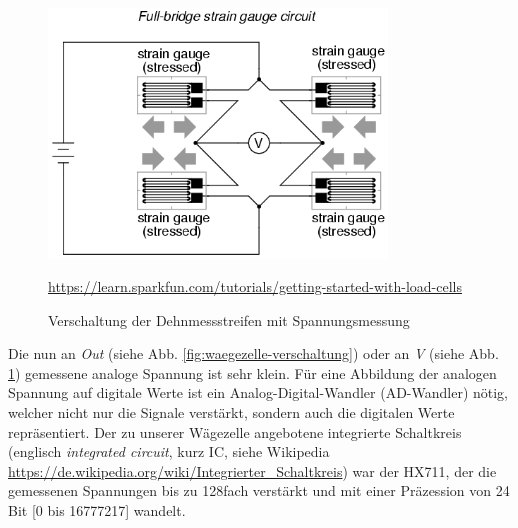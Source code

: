 \begin{figure}[H]
    \center
    \includegraphics[width=9cm]{Bilder/waegezelle-full.png}\\
    \caption{Verschaltung der Dehnmessstreifen mit Spannungsmessung}
    \begin{flushleft} \quelle\url{https://learn.sparkfun.com/tutorials/getting-started-with-load-cells} \end{flushleft}
    \label{fig:waegezelle-full}
\end{figure}
\noindent
Die nun an \textit{Out} (siehe Abb. \ref{fig:waegezelle-verschaltung}) oder an \textit{V} (siehe Abb. \ref{fig:waegezelle-full}) gemessene analoge Spannung ist sehr klein. Für eine Abbildung der analogen Spannung auf digitale Werte ist ein Analog-Digital-Wandler (AD-Wandler) nötig, welcher nicht nur die Signale verstärkt, sondern auch die digitalen Werte repräsentiert. Der zu unserer Wägezelle angebotene integrierte Schaltkreis (englisch \textit{integrated circuit}, kurz IC, siehe Wikipedia \url{https://de.wikipedia.org/wiki/Integrierter_Schaltkreis}) war der HX711, der die gemessenen Spannungen bis zu 128fach verstärkt und mit einer Präzession von 24 Bit [0 bis 16777217] wandelt.
\newpage


